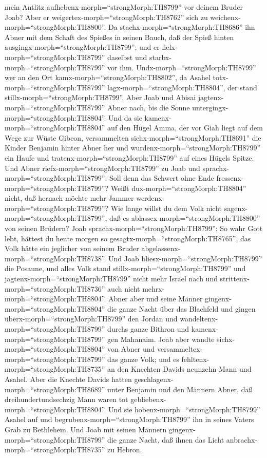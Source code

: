 mein Antlitz aufhebenx-morph=``strongMorph:TH8799'' vor deinem Bruder
Joab?  Aber er weigertex-morph=``strongMorph:TH8762'' sich
zu weichenx-morph=``strongMorph:TH8800''. Da
stachx-morph=``strongMorph:TH8686'' ihn Abner mit dem Schaft des Spießes
in seinen Bauch, daß der Spieß hinten
ausgingx-morph=``strongMorph:TH8799''; und er
fielx-morph=``strongMorph:TH8799'' daselbst und
starbx-morph=``strongMorph:TH8799'' vor ihm.
Undx-morph=``strongMorph:TH8799'' wer an den Ort
kamx-morph=``strongMorph:TH8802'', da Asahel
totx-morph=``strongMorph:TH8799'' lagx-morph=``strongMorph:TH8804'', der
stand stillx-morph=``strongMorph:TH8799''.  Aber Joab und
Abisai jagtenx-morph=``strongMorph:TH8799'' Abner nach, bis die Sonne
untergingx-morph=``strongMorph:TH8804''. Und da sie
kamenx-morph=``strongMorph:TH8804'' auf den Hügel Amma, der vor Giah
liegt auf dem Wege zur Wüste Gibeon,  versammelten
sichx-morph=``strongMorph:TH8691'' die Kinder Benjamin hinter Abner her
und wurdenx-morph=``strongMorph:TH8799'' ein Haufe und
tratenx-morph=``strongMorph:TH8799'' auf eines Hügels Spitze.
 Und Abner riefx-morph=``strongMorph:TH8799'' zu Joab und
sprachx-morph=``strongMorph:TH8799'': Soll denn das Schwert ohne Ende
fressenx-morph=``strongMorph:TH8799''? Weißt
dux-morph=``strongMorph:TH8804'' nicht, daß hernach möchte mehr Jammer
werdenx-morph=``strongMorph:TH8799''? Wie lange willst du dem Volk nicht
sagenx-morph=``strongMorph:TH8799'', daß es
ablassex-morph=``strongMorph:TH8800'' von seinen Brüdern? 
Joab sprachx-morph=``strongMorph:TH8799'': So wahr Gott lebt, hättest du
heute morgen so gesagtx-morph=``strongMorph:TH8765'', das Volk hätte ein
jeglicher von seinem Bruder abgelassenx-morph=``strongMorph:TH8738''.
 Und Joab bliesx-morph=``strongMorph:TH8799'' die Posaune,
und alles Volk stand stillx-morph=``strongMorph:TH8799'' und
jagtenx-morph=``strongMorph:TH8799'' nicht mehr Israel nach und
strittenx-morph=``strongMorph:TH8736'' auch nicht
mehrx-morph=``strongMorph:TH8804''.  Abner aber und seine
Männer gingenx-morph=``strongMorph:TH8804'' die ganze Nacht über das
Blachfeld und gingen überx-morph=``strongMorph:TH8799'' den Jordan und
wandeltenx-morph=``strongMorph:TH8799'' durchs ganze Bithron und
kamenx-morph=``strongMorph:TH8799'' gen Mahanaim.  Joab
aber wandte sichx-morph=``strongMorph:TH8804'' von Abner und
versammeltex-morph=``strongMorph:TH8799'' das ganze Volk; und es
fehltenx-morph=``strongMorph:TH8735'' an den Knechten Davids neunzehn
Mann und Asahel.  Aber die Knechte Davids hatten
geschlagenx-morph=``strongMorph:TH8689'' unter Benjamin und den Männern
Abner, daß dreihundertundsechzig Mann waren tot
gebliebenx-morph=``strongMorph:TH8804''.  Und sie
hobenx-morph=``strongMorph:TH8799'' Asahel auf und
begrubenx-morph=``strongMorph:TH8799'' ihn in seines Vaters Grab zu
Bethlehem. Und Joab mit seinen Männern
gingenx-morph=``strongMorph:TH8799'' die ganze Nacht, daß ihnen das
Licht anbrachx-morph=``strongMorph:TH8735'' zu Hebron.

